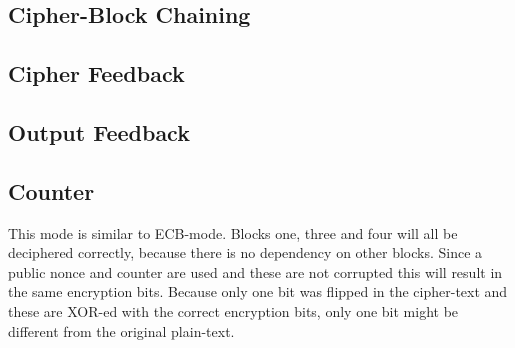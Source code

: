 \documentclass{article}
\begin{document}
\subsection{Cipher-Block Chaining}
\subsection{Cipher Feedback}
\subsection{Output Feedback}
\subsection{Counter}
This mode is similar to ECB-mode. Blocks one, three and four will all be deciphered correctly, because there is no dependency on other blocks. Since a public nonce and counter are used and these are not corrupted this will result in the same encryption bits. Because only one bit was flipped in the cipher-text and these are XOR-ed with the correct encryption bits, only one bit might be different from the original plain-text.


%
% 
\end{document}
